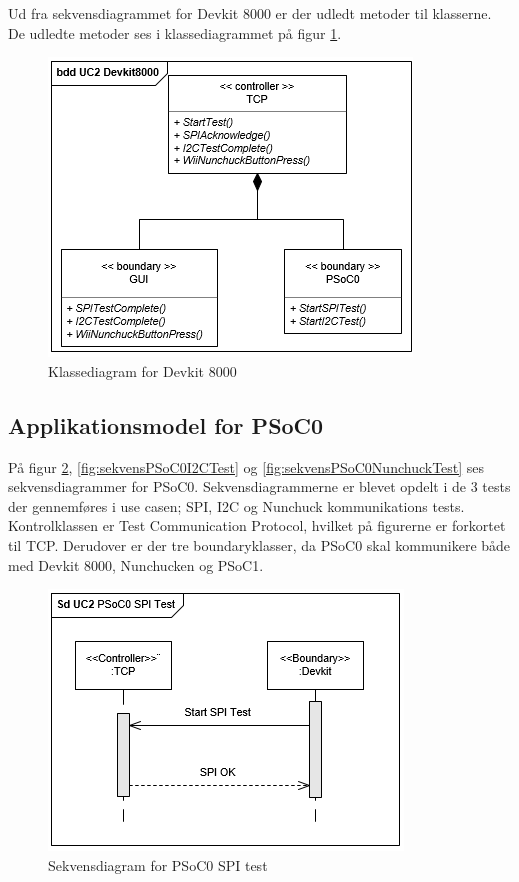 Ud fra sekvensdiagrammet for Devkit 8000 er der udledt metoder til klasserne. De udledte metoder ses i klassediagrammet på figur \ref{fig:klasseDevkit}. 

\begin{figure}[H]
	\centering
	\includegraphics[] {Systemarkitektur/images/DevKit8000ClassDiagram}
	\caption{Klassediagram for Devkit 8000}
	\label{fig:klasseDevkit}
\end{figure}

\subsection{Applikationsmodel for PSoC0}
På figur \ref{fig:sekvensPSoC0SPITest}, \ref{fig:sekvensPSoC0I2CTest} og \ref{fig:sekvensPSoC0NunchuckTest} ses sekvensdiagrammer for PSoC0. Sekvensdiagrammerne er blevet opdelt i de 3 tests der gennemføres i use casen; SPI, I2C og Nunchuck kommunikations tests. Kontrolklassen er Test Communication Protocol, hvilket på figurerne er forkortet til TCP. Derudover er der tre boundaryklasser, da PSoC0 skal kommunikere både med Devkit 8000, Nunchucken og PSoC1.

\begin{figure}[H]
	\centering
	\includegraphics[width=.8\textwidth] {Systemarkitektur/images/SDPSoC0SPITest}
	\caption{Sekvensdiagram for PSoC0 SPI test}
	\label{fig:sekvensPSoC0SPITest}
\end{figure}

